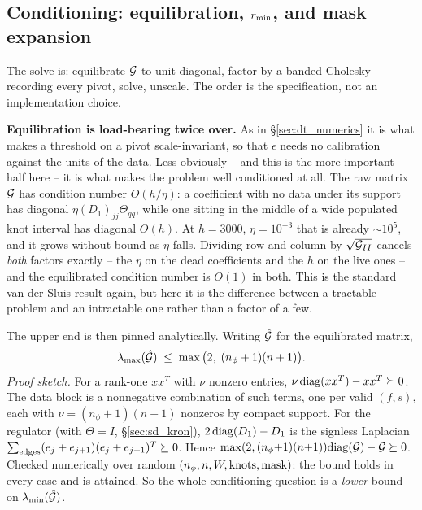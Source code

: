 \documentclass{article}
\numberwithin{equation}{section}   %
\begin{document}
\subsection{Conditioning: equilibration, $r_{\rm min}$, and mask expansion}
\label{sec:sd_conditioning}

The solve is: equilibrate ${\cal G}$ to unit diagonal, factor by a banded Cholesky recording every pivot,
solve, unscale.  The order is the specification, not an implementation choice.

{\bf Equilibration is load-bearing twice over.}  As in \S\ref{sec:dt_numerics} it is what makes a threshold on
a pivot scale-invariant, so that $\epsilon$ needs no calibration against the units of the data.  Less obviously
-- and this is the more important half here -- it is what makes the problem well conditioned at all.  The raw
matrix ${\cal G}$ has condition number $O(h/\eta)$: a coefficient with no data under its support has diagonal
$\eta (D_1)_{jj}\Theta_{qq}$, while one sitting in the middle of a wide populated knot interval has diagonal
$O(h)$.  At $h = 3000$, $\eta = 10^{-3}$ that is already $\sim 10^5$, and it grows without bound as $\eta$
falls.  Dividing row and column by $\sqrt{{\cal G}_{II}}$ cancels {\em both} factors exactly -- the $\eta$ on
the dead coefficients and the $h$ on the live ones -- and the equilibrated condition number is $O(1)$ in both.
This is the standard van der Sluis result again, but here it is the difference between a tractable problem and
an intractable one rather than a factor of a few.

The upper end is then pinned analytically.  Writing $\hat{\cal G}$ for the equilibrated matrix,
\begin{equation}
\lambda_{\max}(\hat{\cal G}) \;\le\; \max\big(2,\; (n_\phi+1)(n+1)\big) .
\label{eq:sd_lammax}
\end{equation}
{\em Proof sketch.}  For a rank-one $xx^T$ with $\nu$ nonzero entries,
$\nu\,{\rm diag}(xx^T) - xx^T \succeq 0$.  The data block is a nonnegative combination of such terms, one per
valid $(f,s)$, each with $\nu = (n_\phi+1)(n+1)$ nonzeros by compact support.  For the regulator (with
$\Theta = I$, \S\ref{sec:sd_kron}), $2\,{\rm diag}(D_1) - D_1$ is the signless Laplacian
$\sum_{\rm edges}(e_j + e_{j+1})(e_j + e_{j+1})^T \succeq 0$.  Hence
$\max(2,(n_\phi{+}1)(n{+}1)){\rm diag}({\cal G}) - {\cal G} \succeq 0$.  Checked numerically over
random $(n_\phi, n, W, {\rm knots}, {\rm mask})$: the bound holds in every case and is attained.  So the whole
conditioning question is a {\em lower} bound on $\lambda_{\min}(\hat{\cal G})$.
\end{document}
